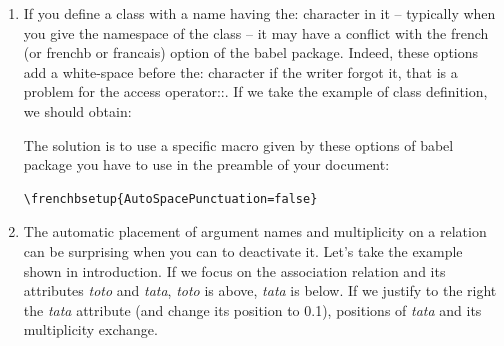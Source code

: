 \documentclass[a4paper,11pt]{report}
\begin{document}
\begin{enumerate}
	      \medskip

	\item If you define a class with a name having the: character in it -- typically when you give the namespace of the class -- it may have a conflict with the french (or frenchb or francais) option of the babel package. Indeed, these options add a white-space before the: character if the writer forgot it, that is a problem for the access operator::. If we take the example of class definition, we should obtain:

	      \medskip

	      \begin{minipage}{0.6\textwidth}
		      
	      \end{minipage}
	      \begin{minipage}{0.4\textwidth}
		      \begin{center}
		      \end{center}
	      \end{minipage}

	      \medskip

	      The solution is to use a specific macro given by these options of babel package you have to use in the preamble of your document:

	      \medskip

	      \begin{lstlisting}
\frenchbsetup{AutoSpacePunctuation=false}
\end{lstlisting}

	      \medskip

	\item The automatic placement of argument names and multiplicity on a relation can be surprising when you can to deactivate it. Let's take the example shown in introduction. If we focus on the association relation and its attributes {\it toto} and {\it tata}, {\it toto} is above, {\it tata} is below.
	      If we justify to the right the {\it tata} attribute (and change its position to 0.1), positions of {\it tata} and its multiplicity exchange.

	      \begin{center}
	      \end{center}

\end{enumerate}
\end{document}
